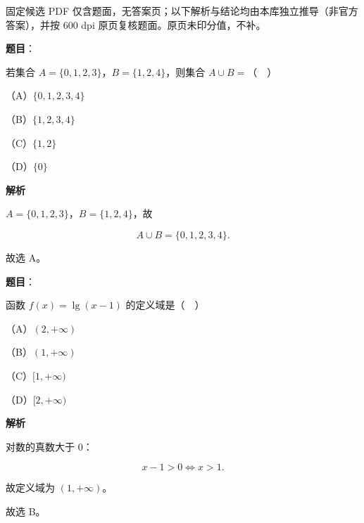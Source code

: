 
\begin{gktip}
固定候选 PDF 仅含题面，无答案页；以下解析与结论均由本库独立推导（非官方答案），并按 600 dpi 原页复核题面。原页未印分值，不补。
\end{gktip}

\begin{answer}

\textbf{题目}：

若集合 $A=\{0,1,2,3\}$，$B=\{1,2,4\}$，则集合 $A\cup B=$（　）

（A）$\{0,1,2,3,4\}$

（B）$\{1,2,3,4\}$

（C）$\{1,2\}$

（D）$\{0\}$

\textbf{解析}

$A=\{0,1,2,3\}$，$B=\{1,2,4\}$，故

\nopagebreak[4]
\[A\cup B=\{0,1,2,3,4\}.\]

故选 A。


\end{answer}
\begin{answer}

\textbf{题目}：

函数 $f(x)=\lg(x-1)$ 的定义域是（　）

（A）$(2,+\infty)$

（B）$(1,+\infty)$

（C）$[1,+\infty)$

（D）$[2,+\infty)$

\textbf{解析}

对数的真数大于 $0$：

\nopagebreak[4]
\[x-1>0\iff x>1.\]

故定义域为 $(1,+\infty)$。

故选 B。


\end{answer}
